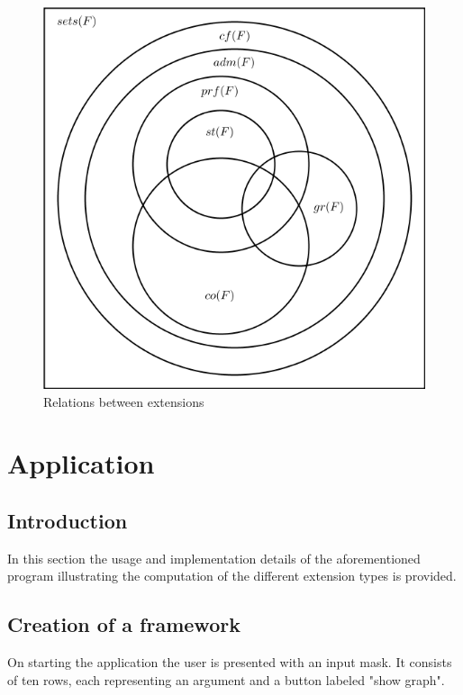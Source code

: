 \documentclass[draft,final]{vutinfth} %
\begin{document}
\FloatBarrier
	\begin{figure}[!htb]
		\centering
		\includegraphics[scale=0.6]{pics/diagram.png}
		\caption{Relations between extensions}
	\end{figure}
\FloatBarrier

\chapter{Application}

\section{Introduction}
In this section the usage and implementation details of the aforementioned program illustrating the computation of the different extension types is provided.

\section{Creation of a framework}
On starting the application the user is presented with an input mask. It consists of ten rows, each representing an argument and a button labeled "show graph".
\end{document}
